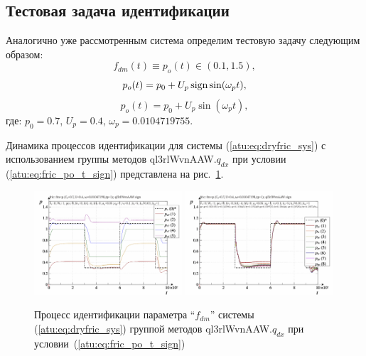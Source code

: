 

\subsection{Тестовая задача идентификации }   %

Аналогично уже рассмотренным система
определим тестовую задачу следующим образом:
\[
  f_{dm}(t) \equiv p_o(t) \in (0.1, 1.5),
\]
%
\begin{equation}
  p_o(t) = p_0 +  U_{p} \operatorname*{sign} \sin( \omega_{p} t ),
  \label{atu:eq:fric_po_t_sign}
\end{equation}
%
%
\begin{equation}
  p_o(t) = p_0 +  U_{p} \sin( \omega_{p} t ),
  \label{atu:eq:fric_po_t_sin}
\end{equation}
%
где:
$p_0 = 0.7$, $U_p=0.4$, $\omega_p=0.0104719755$.

Динамика процессов идентификации для системы (\ref{atu:eq:dryfric_sys})
с использованием группы методов ql3rlWvnAAW.$q_{dx}$
при условии (\ref{atu:eq:fric_po_t_sign})
представлена на рис.~\ref{atu:f:fric_id_ql3rlWvnAAW_q_dx_sign}.


\begin{figure}[htb!]
  \centerline{
    \includegraphics[width=0.49\textwidth]{p/cha/fric/ql3rlWvnAAW/fric_id-p_t_pi_ql3rlWvnAAW_sign.png}
    \hfill
    \includegraphics[width=0.49\textwidth]{p/cha/fric/ql3rlWvnAAW/fric_id-p_t_p_ql3rlWvnAAW_sign.png}
  }
  \caption{Процесс идентификации параметра ``$f_{dm}$'' системы (\ref{atu:eq:dryfric_sys}) группой методов ql3rlWvnAAW.$q_{dx}$ при условии~(\ref{atu:eq:fric_po_t_sign})}
  \label{atu:f:fric_id_ql3rlWvnAAW_q_dx_sign}
\end{figure}

